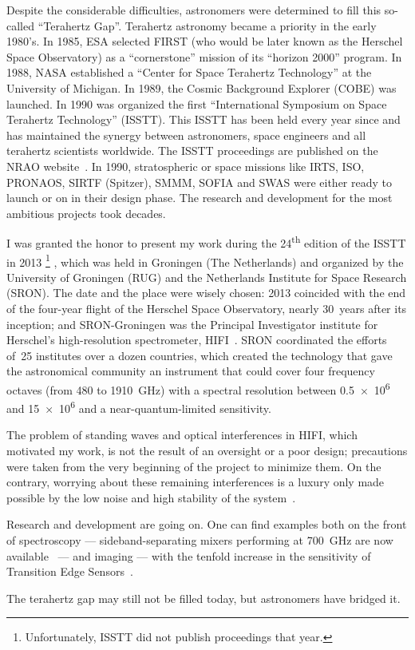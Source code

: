 Despite the considerable difficulties, astronomers were determined to fill this so-called ``Terahertz Gap''.
Terahertz astronomy became a priority in the early 1980's.
In 1985, ESA selected FIRST (who would be later known as the Herschel Space Observatory) as a ``cornerstone'' mission of its ``horizon 2000'' program.
In 1988, NASA established a ``Center for Space Terahertz Technology'' at the University of Michigan.
In 1989, the Cosmic Background Explorer (COBE) was launched.
In 1990 was organized the first ``International Symposium on Space Terahertz Technology'' (ISSTT).
This ISSTT has been held every year since and has maintained the synergy between astronomers, space engineers and all terahertz scientists worldwide.
The ISSTT proceedings are published on the NRAO website~\parencite{nrao:isstt}.
In 1990, stratospheric or space missions like IRTS, ISO, PRONAOS, SIRTF (Spitzer), SMMM, SOFIA and SWAS were either ready to launch or on in their design phase.
The research and development for the most ambitious projects took decades.

I was granted the honor to present my work during the 24\textsuperscript{th}
edition of the ISSTT in 2013%
\footnote{
    Unfortunately, ISSTT did not publish proceedings that year.
}%
, which was held in Groningen (The Netherlands) and organized by the University of Groningen (RUG) and the Netherlands Institute for Space Research (SRON).
The date and the place were wisely chosen:
2013 coincided with the end of the four-year flight of the Herschel Space Observatory, nearly \SI{30}{years} after its inception;
and SRON-Groningen was the Principal Investigator institute for Herschel's high-resolution spectrometer, HIFI~\parencite{AA_518_L6}.
SRON coordinated the efforts of~25 institutes over a dozen countries, which created the technology that gave the astronomical community an instrument that could cover four frequency octaves (from \num{480} to \SI{1910}{\giga\hertz}) with a spectral resolution between \num{0.5e6} and \num{15e6} and a near-quantum-limited sensitivity.

The problem of standing waves and optical interferences in HIFI, which motivated my work, is not the result of an oversight or a poor design; precautions were taken from the very beginning of the project to minimize them.
On the contrary, worrying about these remaining interferences is a luxury only made possible by the low noise and high stability of the system~\parencite{AA_537_A17}.

Research and development are going on.
One can find examples both on the front of spectroscopy
--- sideband-separating mixers performing at \SI{700}{\giga\hertz} are now available~\parencite{khudchenko2011first} --- and imaging --- with the tenfold increase in the sensitivity of Transition Edge Sensors~\parencite{jackson2012spica}.


The terahertz gap may still not be filled today, but astronomers have bridged it.






